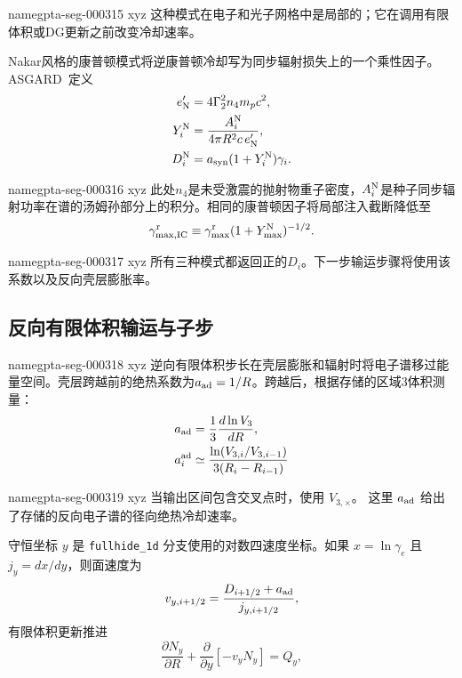 \documentclass[twocolumn]{aastex702}
\makeatletter
\newcommand{\asgard}{\textsc{ASGARD}}
\providecommand{\gptareaderanchor}[1]{\pdfdest name{#1} xyz}%
\providecommand{\gptareaderanchor}[1]{\special{pdf:dest (#1) [ @thispage /XYZ @xpos @ypos null ]}}%
\makeatother
\begin{document}
\gptareaderanchor{gpta-seg-000315}%
这种模式在电子和光子网格中是局部的；它在调用有限体积或DG更新之前改变冷却速率。

Nakar风格的康普顿模式将逆康普顿冷却写为同步辐射损失上的一个乘性因子。\asgard\ 定义
\begin{equation}
\begin{aligned}
e_{\rm N}'&=4\Gamma_2^2 n_4m_pc^2,\\
Y_i^{\rm N}&=\frac{A_i^{\rm N}}{4\pi R^2c\,e_{\rm N}'},\\
D_i^{\rm N}&=a_{\rm syn}(1+Y_i^{\rm N})\gamma_i .
\end{aligned}
\end{equation}

\gptareaderanchor{gpta-seg-000316}%
此处\(n_4\)是未受激震的抛射物重子密度，\(A_i^{\rm N}\)是种子同步辐射功率在谱的汤姆孙部分上的积分。相同的康普顿因子将局部注入截断降低至
\begin{equation}
\gamma_{\max,{\rm IC}}^{\rm r}
\equiv \gamma_{\max}^{\rm r}(1+Y_{\max}^{\rm N})^{-1/2}.
\end{equation}

\gptareaderanchor{gpta-seg-000317}%
所有三种模式都返回正的\(D_i\)。下一步输运步骤将使用该系数以及反向壳层膨胀率。

\subsection{反向有限体积输运与子步}


\gptareaderanchor{gpta-seg-000318}%
逆向有限体积步长在壳层膨胀和辐射时将电子谱移过能量空间。壳层跨越前的绝热系数为\(a_{\rm ad}=1/R\)。跨越后，根据存储的区域3体积测量：
\begin{equation}
\begin{aligned}
a_{\rm ad}&=\frac{1}{3}\frac{d\ln V_3}{dR},\\
a_i^{\rm ad}&\simeq
\frac{\ln(V_{3,i}/V_{3,i-1})}{3(R_i-R_{i-1})}
\end{aligned}
\end{equation}

\gptareaderanchor{gpta-seg-000319}%
当输出区间包含交叉点时，使用 \(V_{3,\times}\)。
这里 \(a_{\rm ad}\) 给出了存储的反向电子谱的径向绝热冷却速率。

守恒坐标 \(y\) 是 \texttt{fullhide\_1d} 分支使用的对数四速度坐标。如果 \(x=\ln\gamma_e\) 且 \(j_y=dx/dy\)，则面速度为
\begin{equation}
v_{y,i+1/2}=
\frac{D_{i+1/2}+a_{\rm ad}}{j_{y,i+1/2}},
\end{equation}
有限体积更新推进
\begin{equation}
\frac{\partial N_y}{\partial R}
+
\frac{\partial}{\partial y}
\left[-v_yN_y\right]
=Q_y ,
\end{equation}
\end{document}
